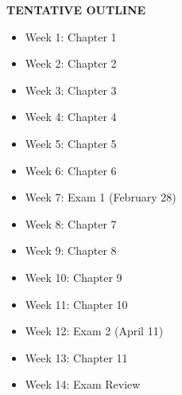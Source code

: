 \documentclass{article}
\begin{document}
\begin{center}
\vspace*{5pt}
{\bf TENTATIVE OUTLINE}
\end{center}
\begin{itemize}
\item Week 1:  Chapter 1
\item Week 2:   Chapter 2 
\item Week 3:  Chapter 3 
\item Week 4:  Chapter 4
\item Week 5:  Chapter 5
\item Week 6:  Chapter 6
\item Week 7:  Exam 1 (February 28)
\item Week 8:  Chapter 7
\item Week 9:  Chapter 8
\item Week 10:  Chapter 9
\item Week 11:  Chapter 10
\item Week 12:  Exam 2 (April 11)
\item Week 13:  Chapter 11
\item Week 14:  Exam Review
\end{itemize}
\end{document}
